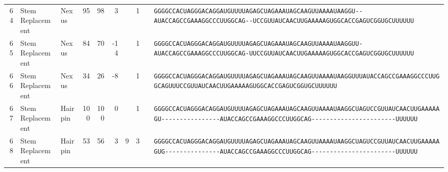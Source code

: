 \begin{tabular}{rllrrrrrcl}
 64 & Stem Replacement & Nexus & 95 & 98 & 3 &  & 1 &  &
 \color{ucsfdarkgrey}\verb|GGGGCCACUAGGGACAGGAU|\color{ucsforange}\verb|GUUUUA|\color{ucsfblue}\verb|GAGCUAGAAAUAGCAAGU|\color{ucsforange}\verb|UAAAAUAA|\color{ucsfnavy}\verb|GGU--|\color{ucsfpurple}\verb|AUACCAGCCGAAAGGCCCUUGGCAG|\color{ucsfnavy}\verb|--UCCGU|\color{ucsforange}\verb|UAUCA|\color{ucsfteal}\verb|ACUUGAAAAAGUG|\color{ucsforange}\verb|GCACCGAGUCGGUGCUUUUUU| \\

 65 & Stem Replacement & Nexus & 84 & 70 & -14 &  & 1 &  &
 \color{ucsfdarkgrey}\verb|GGGGCCACUAGGGACAGGAU|\color{ucsforange}\verb|GUUUUA|\color{ucsfblue}\verb|GAGCUAGAAAUAGCAAGU|\color{ucsforange}\verb|UAAAAUAA|\color{ucsfnavy}\verb|GGUU-|\color{ucsfpurple}\verb|AUACCAGCCGAAAGGCCCUUGGCAG|\color{ucsfnavy}\verb|-UUCCGU|\color{ucsforange}\verb|UAUCA|\color{ucsfteal}\verb|ACUUGAAAAAGUG|\color{ucsforange}\verb|GCACCGAGUCGGUGCUUUUUU| \\

 66 & Stem Replacement & Nexus & 34 & 26 & -8 &  & 1 &  &
 \color{ucsfdarkgrey}\verb|GGGGCCACUAGGGACAGGAU|\color{ucsforange}\verb|GUUUUA|\color{ucsfblue}\verb|GAGCUAGAAAUAGCAAGU|\color{ucsforange}\verb|UAAAAUAA|\color{ucsfnavy}\verb|GGUUU|\color{ucsfpurple}\verb|AUACCAGCCGAAAGGCCCUUGGCAG|\color{ucsfnavy}\verb|UUUCCGU|\color{ucsforange}\verb|UAUCA|\color{ucsfteal}\verb|ACUUGAAAAAGUG|\color{ucsforange}\verb|GCACCGAGUCGGUGCUUUUUU| \\

 67 & Stem Replacement & Hairpin & 100 & 100 & 0 &  & 1 &  &
 \color{ucsfdarkgrey}\verb|GGGGCCACUAGGGACAGGAU|\color{ucsforange}\verb|GUUUUA|\color{ucsfblue}\verb|GAGCUAGAAAUAGCAAGU|\color{ucsforange}\verb|UAAAAUAA|\color{ucsfnavy}\verb|GGCUAGUCCGU|\color{ucsforange}\verb|UAUCA|\color{ucsfteal}\verb|ACUUGAAAAAGU-|\color{ucsforange}\verb|---------------|\color{ucsfpurple}\verb|AUACCAGCCGAAAGGCCCUUGGCAG|\color{ucsforange}\verb|-----------------------UUUUUU| \\

 68 & Stem Replacement & Hairpin & 53 & 56 & 3 & 9 & 3 &  &
 \color{ucsfdarkgrey}\verb|GGGGCCACUAGGGACAGGAU|\color{ucsforange}\verb|GUUUUA|\color{ucsfblue}\verb|GAGCUAGAAAUAGCAAGU|\color{ucsforange}\verb|UAAAAUAA|\color{ucsfnavy}\verb|GGCUAGUCCGU|\color{ucsforange}\verb|UAUCA|\color{ucsfteal}\verb|ACUUGAAAAAGUG|\color{ucsforange}\verb|---------------|\color{ucsfpurple}\verb|AUACCAGCCGAAAGGCCCUUGGCAG|\color{ucsforange}\verb|-----------------------UUUUUU| \\


\end{tabular}

